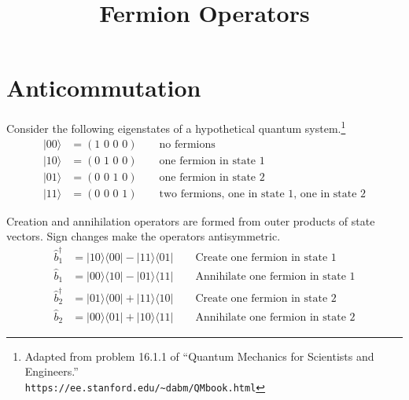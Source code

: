 \documentclass[12pt]{article}
\title{Fermion Operators}
\date{}
\author{}
\begin{document}
\maketitle

\tableofcontents

\newpage

\section{Anticommutation}
Consider the following eigenstates of a hypothetical quantum system.\footnote{
Adapted from problem 16.1.1 of ``Quantum Mechanics for Scientists and Engineers.''\\
{\tt https://ee.stanford.edu/{\textasciitilde}dabm/QMbook.html}}
\begin{align*}
|00\rangle&=(\text{1 0 0 0})\qquad\text{no fermions}\\
|10\rangle&=(\text{0 1 0 0})\qquad\text{one fermion in state 1}\\
|01\rangle&=(\text{0 0 1 0})\qquad\text{one fermion in state 2}\\
|11\rangle&=(\text{0 0 0 1})\qquad\text{two fermions, one in state 1, one in state 2}
\end{align*}

\noindent
Creation and annihilation operators are formed from outer products of state vectors.
Sign changes make the operators antisymmetric.
\begin{align*}
\hat{b}_1^\dag&=|10\rangle\langle00|-|11\rangle\langle01| \qquad\text{Create one fermion in state 1}
\\
\hat{b}_1&=|00\rangle\langle10|-|01\rangle\langle11| \qquad\text{Annihilate one fermion in state 1}
\\
\hat{b}_2^\dag&=|01\rangle\langle00|+|11\rangle\langle10| \qquad\text{Create one fermion in state 2}
\\
\hat{b}_2&=|00\rangle\langle01|+|10\rangle\langle11| \qquad\text{Annihilate one fermion in state 2}
\end{align*}
\end{document}

